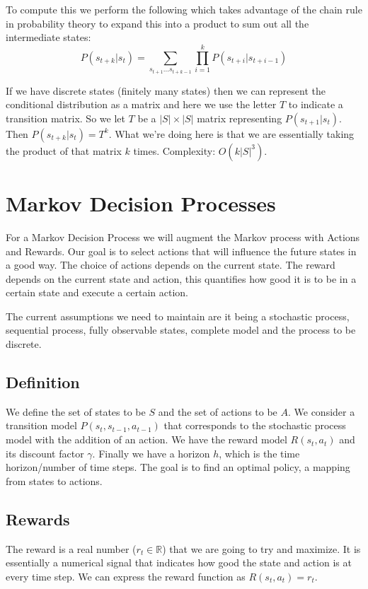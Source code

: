 \documentclass[12pt]{article}
\begin{document}
        To compute this we perform the following which takes advantage of the chain rule in probability theory to expand
        this into a product to sum out all the intermediate states:
        $$ P(s_{t+k} | s_{t}) = \sum_{s_{t+1} ... s_{t+k-1}} \prod^{k}_{i=1} P(s_{t+i} | s_{t+i-1}) $$

        If we have discrete states (finitely many states) then we can represent the conditional distribution as a matrix
        and here we use the letter $T$ to indicate a transition matrix. So we let $T$ be a $|S| \times |S|$ matrix
        representing $P(s_{t+1} | s_{t})$. Then $P(s_{t+k} | s_t) = T^k$. What we're doing here is that we are
        essentially taking the product of that matrix $k$ times. Complexity: $O(k |S|^3)$.

\section{Markov Decision Processes}
    For a Markov Decision Process we will augment the Markov process with Actions and Rewards. Our goal is to select
    actions that will influence the future states in a good way. The choice of actions depends on the current state. The
    reward depends on the current state and action, this quantifies how good it is to be in a certain state and execute
    a certain action.

    The current assumptions we need to maintain are it being a stochastic process, sequential process, fully observable
    states, complete model and the process to be discrete.

    \subsection{Definition}
        We define the set of states to be $S$ and the set of actions to be $A$. We consider a transition model $P(s_t,
        s_{t-1}, a_{t-1})$ that corresponds to the stochastic process model with the addition of an action. We have the
        reward model $R(s_t, a_t)$ and its discount factor $\gamma$. Finally we have a horizon $h$, which is the time
        horizon/number of time steps. The goal is to find an optimal policy, a mapping from states to actions. 

    \subsection{Rewards}
        The reward is a real number ($r_t \in \mathbb{R}$) that  we are going to try and maximize. It is essentially a numerical signal that
        indicates how good the state and action is at every time step. We can express the reward function as $R(s_t,
        a_t) = r_t$. 
\end{document}
